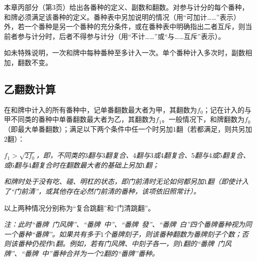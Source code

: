 \documentclass[UTF8]{article}
\newcommand{\q}{\quad}
\begin{document}
  本章丙部分（第3页）给出各番种的定义、副数和翻数。对参与计分的每个番种，和牌必须满足该番种的定义。番种表中另加说明的情况（用“可加计……”表示）外，若一个番种是另一个番种的充分条件，或在番种表中明确指出二者互斥，则当前者参与计分时，后者不得参与计分（用“不计……”或“与……互斥”表示）。
  
  如未特殊说明，一次和牌中每种番种至多计入一次。单个番种计入多次时，副数相加，翻数不变。
  
  \subsection*{乙\q 翻数计算}
  在和牌中计入的所有番种中，记单番翻数最大者为甲，其翻数为$f_0$；记在计入的与甲不同类的番种中单番翻数最大者为乙，其翻数为$f_1$。一般情况下，和牌翻数为$f_0$（即最大单番翻数）；满足以下两个条件中任一个时另加$1$翻（若都满足，则共另加$2$翻）：\\\begin{enumerate*}[itemjoin=\\]
  \item $f_1>\sqrt{2f_0}$\it{，即，不同类的$3$翻与$3$翻复合、$4$翻与$3$或$4$翻复合、$5$翻与$4$或$5$翻复合、或$6$翻与$4$翻复合时在翻数最大者的基础上另加$1$翻；}
  \item \it{和牌时处于没有吃、碰、明杠的状态，即门前清时无论如何都另加$1$翻（即使计入了“门前清”，或其他存在必然门前清的番种，该项依旧照常计）。}
  \end{enumerate*}

  \noindent 以上两种情况分别称为“复合跳翻”和“门清跳翻”。\vspace{1ex}
  
  \it{注：此时“番牌\ 门风牌”、“番牌\ 中”、“番牌\ 發”、“番牌\ 白”四个番牌番种视为同一个番种“番牌”。如果共有多于$1$个番牌刻子，则该番种翻数为番牌刻子个数；否则该番种仍视作$1$翻。例如，若有门风牌、中刻子各一，则$1$翻的“番牌\ 门风牌”、“番牌\ 中”番种合并为一个$2$翻的“番牌”番种。}\rm
  
  \newpage
  
\end{document}

